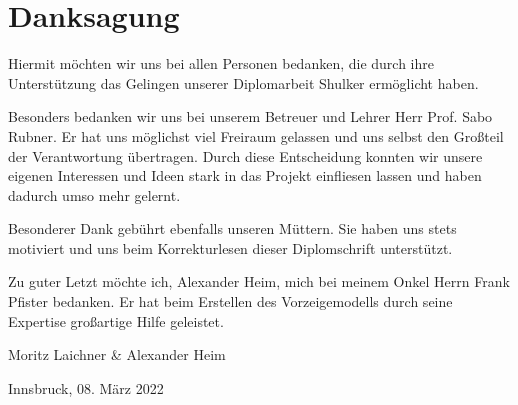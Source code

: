 \section*{Danksagung}

Hiermit möchten wir uns bei allen Personen bedanken, die durch ihre Unterstützung das Gelingen unserer Diplomarbeit Shulker ermöglicht haben.

Besonders bedanken wir uns bei unserem Betreuer und Lehrer Herr Prof. Sabo Rubner. Er hat uns möglichst viel
Freiraum gelassen und uns selbst den Großteil der Verantwortung übertragen. Durch diese Entscheidung konnten
wir unsere eigenen Interessen und Ideen stark in das Projekt einfliesen lassen und haben dadurch umso mehr gelernt.

Besonderer Dank gebührt ebenfalls unseren Müttern. Sie haben uns stets motiviert und uns beim Korrekturlesen dieser Diplomschrift
unterstützt.

Zu guter Letzt möchte ich, Alexander Heim, mich bei meinem Onkel Herrn Frank Pfister bedanken. Er hat beim
Erstellen des Vorzeigemodells durch seine Expertise großartige Hilfe geleistet.

\vspace{1cm}

Moritz Laichner \& Alexander Heim

Innsbruck, 08. März 2022

\newpage